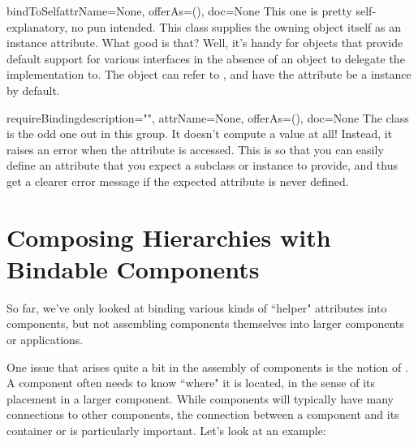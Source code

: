 \begin{verbatim%
}
\begin{verbatim%
}
\begin{verbatim%
}
\begin{verbatim%
}
\begin{verbatim%
}
\begin{verbatim%
}
\begin{verbatim%
}
\begin{verbatim%
}
\begin{verbatim%
}
\begin{funcdesc}{bindToSelf}{attrName=None, offerAs=(), doc=None}
This one is pretty self-explanatory, no pun intended.  This class supplies
the owning object itself as an instance attribute.  What good is that?  Well,
it's handy for objects that provide default support for various interfaces
in the absence of an object to delegate the implementation to.  The object
can refer to , and have the
 attribute be a 
instance by default.
\end{funcdesc}

\begin{funcdesc}{requireBinding}{description="", attrName=None, offerAs=(),
doc=None}
The  class is the odd one out in this group.
It doesn't compute a value at all!  Instead, it raises an error when the
attribute is accessed.  This is so that you can easily define an attribute that
you expect a subclass or instance to provide, and thus get a clearer error
message if the expected attribute is never defined.
\end{funcdesc}


\newpage




















\section{Composing Hierarchies with Bindable Components}

So far, we've only looked at binding various kinds of ``helper" attributes
into components, but not assembling components themselves into larger
components or applications.

One issue that arises quite a bit in the assembly of components is the notion
of .  A component often needs to know ``where" it is located,
in the sense of its placement in a larger component.  While components will
typically have many connections to other components, the connection between
a component and its container or  is particularly
important.  Let's look at an example:


\end{verbatim%
}
\end{verbatim%
}
\end{verbatim%
}
\end{verbatim%
}
\end{verbatim%
}
\end{verbatim%
}
\end{verbatim%
}
\end{verbatim%
}
\end{verbatim%
}
